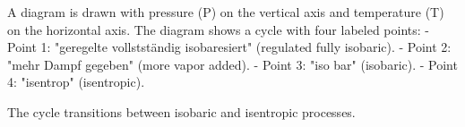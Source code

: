A diagram is drawn with pressure (P) on the vertical axis and temperature (T) on the horizontal axis. The diagram shows a cycle with four labeled points:  
- Point 1: "geregelte vollstständig isobaresiert" (regulated fully isobaric).  
- Point 2: "mehr Dampf gegeben" (more vapor added).  
- Point 3: "iso bar" (isobaric).  
- Point 4: "isentrop" (isentropic).  

The cycle transitions between isobaric and isentropic processes.
